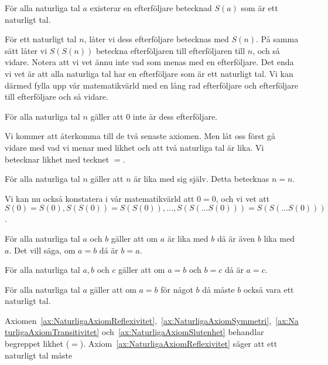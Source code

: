 \begin{axiom}\label{ax:NaturligaAxiomEfterfoljare}
  För alla naturliga tal \(a\) existerar en efterföljare betecknad \(S(a)\)
  som är ett naturligt tal.
\end{axiom}
För ett naturligt tal \(n\), låter vi dess efterföljare betecknas med \(S(n)\).
På samma sätt låter vi \(S(S(n))\) beteckna efterföljaren till efterföljaren
till \(n\), och så vidare.
Notera att vi vet ännu inte vad som menas med en efterföljare.
Det enda vi vet är att alla naturliga tal har en efterföljare som är ett
naturligt tal.
Vi kan därmed fylla upp vår matematikvärld med en lång rad efterföljare och
efterföljare till efterföljare och så vidare.
\begin{axiom}\label{ax:NaturligaAxiomEjCirkular}
  För alla naturliga tal \(n\) gäller att \(0\) inte är dess efterföljare.
\end{axiom}
Vi kommer att återkomma till de två senaste axiomen.
Men låt oss först gå vidare med vad vi menar med likhet och att två naturliga
tal är lika.
Vi betecknar likhet med tecknet \(=\).
\begin{axiom}[Reflexivitet]\label{ax:NaturligaAxiomReflexivitet}
  För alla naturliga tal \(n\) gäller att \(n\) är lika med sig själv.
  Detta betecknas \(n=n\).
\end{axiom}
Vi kan nu också konstatera i vår matematikvärld att \(0=0\), och vi vet att
\(S(0)=S(0), S(S(0)) = S(S(0)), \ldots, S(S(\ldots S(0))) = S(S(\ldots
S(0)))\).
\begin{axiom}[Symmetri]\label{ax:NaturligaAxiomSymmetri}
  För alla naturliga tal \(a\) och \(b\) gäller att om \(a\) är lika med
  \(b\) då är även \(b\) lika med \(a\).
  Det vill säga, om \(a=b\) då är \(b=a\).
\end{axiom}
\begin{axiom}[Transitivitet]\label{ax:NaturligaAxiomTransitivitet}
  För alla naturliga tal \(a,b\) och \(c\) gäller att
  om \(a=b\) och \(b=c\) då är \(a=c\).
\end{axiom}
\begin{axiom}\label{ax:NaturligaAxiomSlutenhet}
  För alla naturliga tal \(a\) gäller att om \(a=b\) för något \(b\) då måste
  \(b\) också vara ett naturligt tal.
\end{axiom}
Axiomen~\ref{ax:NaturligaAxiomReflexivitet},~\ref{ax:NaturligaAxiomSymmetri},~\ref{ax:NaturligaAxiomTransitivitet} 
och~\ref{ax:NaturligaAxiomSlutenhet}
behandlar begreppet likhet (\(=\)).
Axiom~\ref{ax:NaturligaAxiomReflexivitet} säger att ett naturligt tal måste
